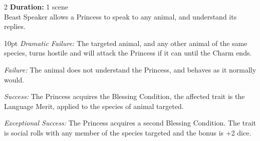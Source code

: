 \begin{multicols}{2}
\noindent \textbf{Duration:} 1 scene \\

\noindent Beast Speaker allows a Princess to speak to any animal, and understand its replies.

\begin{myindentpar}{10pt}    \emph{Dramatic Failure:} The targeted animal, and any other animal of the same species, turns hostile and will attack the Princess if it can until the Charm ends.

    \emph{Failure:} The animal does not understand the Princess, and behaves as it normally would.

    \emph{Success:} The Princess acquires the Blessing Condition, the affected trait is the Language Merit, applied to the species of animal targeted. 

    \emph{Exceptional Success:} The Princess acquires a second Blessing Condition. The trait is social rolls with any member of the species targeted and the bonus is +2 dice. \end{myindentpar}
    







\end{multicols}
